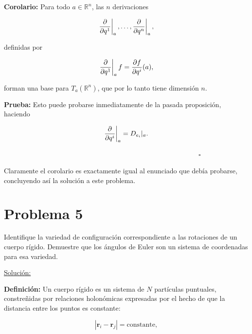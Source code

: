 \documentclass[a4paper,10pt]{article}
\numberwithin{equation}{section}
\newcommand{\zerodel}{.\kern-\nulldelimiterspace}
\newcommand{\definicion}{\textbf{Definición: }}
\newcommand{\prueba}{\textbf{Prueba: }}
\newcommand{\corolario}{\textbf{Corolario: }}
\begin{document}
\vspace{.3cm}

\corolario Para todo $a \in \mathbb{R}^n$, las $n$ derivaciones 

\begin{equation}
 \left\zerodel\frac{\partial}{\partial q^1}\right|_a, \dots, 
  \left\zerodel\frac{\partial}{\partial q^n}\right|_a,
\end{equation}

definidas por 

\begin{equation}
  \left\zerodel\frac{\partial}{\partial q^1}\right|_a f = 
  \frac{\partial f}{\partial q^i}(a),
\end{equation}

forman una base para $T_a(\mathbb{R}^n)$, que por lo tanto tiene 
dimensión $n$.

\vspace{.3cm}

\prueba Esto puede probarse inmediatamente de la pasada proposición, 
haciendo 

\begin{equation}
 \left\zerodel\frac{\partial}{\partial q^i}\right|_a = D_{e_{i}}|_a. 
\end{equation}

$\hspace{12cm} \square$

Claramente el corolario es exactamente igual al enunciado que debía 
probarse, concluyendo así la solución a este problema.

\section{Problema 5}

Identifique la variedad de configuración correspondiente a las rotaciones de un cuerpo 
rígido. Demuestre que los ángulos de Euler son un sistema de coordenadas para esa 
variedad.

\vspace{.3cm}

\underline{Solución:} \vspace{.3cm}

\definicion Un cuerpo rígido es un sistema de $N$ partículas puntuales, constreñidas 
por relaciones holonómicas expresadas por el hecho de que la distancia entre los 
puntos es constante:

\begin{equation}
 |\mathbf{r}_i - \mathbf{r}_j| = \text{constante},
\end{equation}
\end{document}
